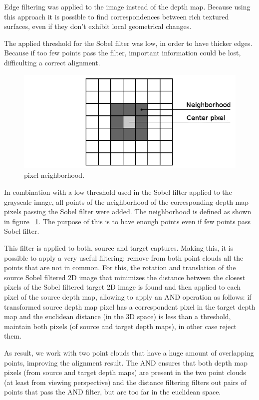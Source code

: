 Edge filtering was applied
to the image instead of the depth map. Because using this approach it is possible to find correspondences between rich textured 
surfaces, even if they don't exhibit local geometrical changes.

The applied threshold for the Sobel filter was low, in order to have thicker edges. Because if too few points pass the filter, important information 
could be lost, difficulting a correct alignment.


\begin{figure}
\begin{center}
\includegraphics[scale=0.4]{images/vecindario}
\end{center}
\caption{pixel neighborhood.}
\label{fig:neighbor}
\end{figure}

In combination with a low threshold used in the Sobel filter applied to the grayscale image, all points of the neighborhood of the corresponding depth map pixels passing the Sobel filter were added. 
The neighborhood is defined as shown in figure ~\ref{fig:neighbor}. The purpose of this is to have enough points even if few points
 pass Sobel filter.

This filter is applied to both, source and target captures. Making this, it is possible to apply a very useful filtering: remove 
from both point clouds all the points that are not in common. For this, the rotation and translation 
of the source Sobel filtered 2D image that minimizes the distance between the closest pixels of the Sobel filtered target 2D image is found and 
then applied to each pixel of the source depth map, 
allowing to apply an AND operation as follows: if transformed source depth map pixel has a correspondent pixel in the target depth map and 
the euclidean distance (in the 3D space) is less than a threshold, maintain both pixels (of source and target depth maps), in other case reject them. 

 As result, we work with two point clouds that have a huge amount of overlapping points, improving the alignment 
result. The AND ensures that both depth map pixels (from source and target depth maps) are present in the two point clouds (at least from viewing 
perspective) and the distance filtering filters out pairs of points that pass the AND filter, but are too far in the euclidean space.

